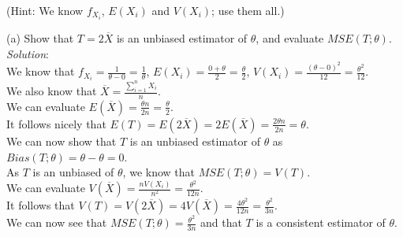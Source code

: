\documentclass[12pt]{article}
\newcommand{\XB}{\color{black}}
\newcommand{\XBB}{\color{blue}}
\begin{document}
(Hint: We know $ f_{X_{i}} $, $ E(X_{i}) $ and $ V(X_{i}) $; use them all.)

\XBB\hrulefill\XB 
\vspace{5mm} 

(a) Show that $ T = 2\overline{X} $ is an unbiased estimator of $ \theta $, and evaluate $ MSE(T; \theta) $.
\vspace{2.5mm} \\
\textit{Solution}:
\vspace{2.5mm} \\

\noindent 
We know that $ \displaystyle f_{X_{i}} = \frac{1}{\theta - 0} = \frac{1}{\theta} $, $ \displaystyle E(X_{i}) = \frac{0 + \theta}{2} = \frac{\theta}{2} $, $ \displaystyle V(X_{i}) = \frac{(\theta - 0)^{2}}{12} = \frac{\theta^2}{12} $. \\

\noindent 
We also know that $ \displaystyle \overline{X} = \frac{\sum_{i=1}^{n} X_{i}}{n} $. \\

\noindent 
We can evaluate $ \displaystyle E(\overline{X}) = \frac{\theta n}{2n} = \frac{\theta}{2} $. \\

\noindent 
It follows nicely that $ \displaystyle E(T) = E(2\overline{X}) = 2E(\overline{X}) = \frac{2\theta n}{2n} = \theta $. \\

\noindent 
We can now show that $ T $ is an unbiased estimator of $ \theta $ as $ Bias(T;\theta) = \theta - \theta = 0 $. \\

\noindent 
As $ T $ is an unbiased of  $ \theta $, we know that $ MSE(T; \theta) = V(T) $. \\

\noindent 
We can evaluate $ \displaystyle V(\overline{X}) = \frac{nV(X_{i})}{n^2} = \frac{\theta^{2}}{12n} $. \\

\noindent 
It follows that $ \displaystyle V(T) = V(2\overline{X}) = 4V(\overline{X}) = \frac{4\theta^{2}}{12n} = \frac{\theta^{2}}{3n} $. \\

\noindent 
We can now see that $ \displaystyle MSE(T; \theta) = \frac{\theta^{2}}{3n} $ and that $ T $ is a consistent estimator of $ \theta $. \\
\end{document}
